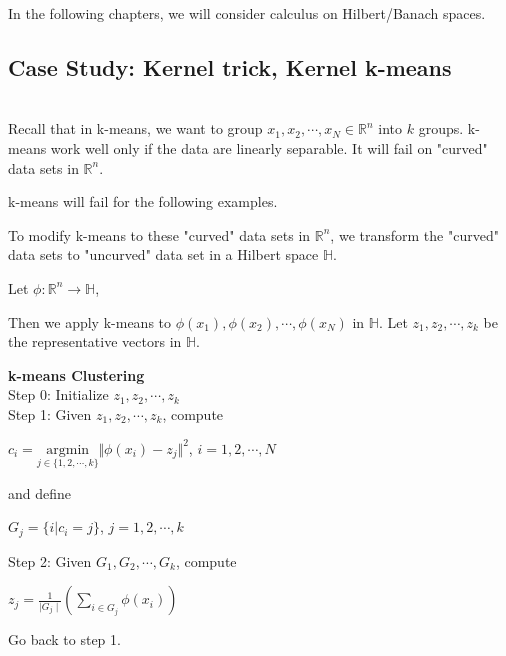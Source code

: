 \documentclass{article}
\begin{document}
In the following chapters, we will consider calculus on Hilbert/Banach spaces.

\pagebreak
\subsection*{Case Study: Kernel trick, Kernel k-means} \\
Recall that in k-means, we want to group $x_1, x_2, \cdots, x_N \in \mathbb{R}^{n}$ into $k$ groups. k-means work well only if the data are linearly separable. It will fail on "curved" data sets in $\mathbb{R}^{n}$.

\bigbreak

k-means will fail for the following examples.  
\begin{center}
\end{center}

To modify k-means to these "curved" data sets in $\mathbb{R}^{n}$, we transform the "curved" data sets to "uncurved" data set in a Hilbert space $\mathbb{H}$. 

Let $\phi: \mathbb{R}^{n} \to \mathbb{H}$,
\begin{center}
\end{center}

Then we apply k-means to $\phi(x_1), \phi(x_2), \cdots, \phi(x_N)$ in $\mathbb{H}$. Let $z_1,z_2,\cdots,z_k$ be the representative vectors in $\mathbb{H}$. 

\bigbreak

\textbf{k-means Clustering} \\
Step 0: Initialize $z_1,z_2,\cdots,z_k$ \\
Step 1: Given $z_1,z_2, \cdots, z_k$, compute
\begin{center}
    $c_i = \underset{j \in \{1,2,\cdots,k\}}{\text{argmin}}\Vert \phi(x_i) - z_j \Vert^{2}$, $i = 1,2, \cdots, N$ 
\end{center}
and define 
\begin{center}
    $G_j = \{i|c_i = j\}$, $j = 1,2, \cdots, k$
\end{center}
Step 2: Given $G_1,G_2,\cdots,G_k$, compute
\begin{center}
    $z_j = \frac{1}{\mid{G_j}\mid} (\sum_{i \in G_j} \phi(x_i))$
\end{center}
Go back to step 1. 
\end{document}

